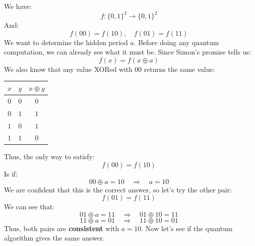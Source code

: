 {}
\noindent
{} We have:
\begin{equation*}
    f: \{0,1\}^2 \to \{0,1\}^2
\end{equation*}
And:
\begin{equation*}
    f(00) = f(10), \quad f(01) = f(11)
\end{equation*}
We want to determine the hidden period $a$. Before doing any quantum computation, we can already see what it must be. Since Simon's promise tells us:
\begin{equation*}
    f(x) = f(x \oplus a)
\end{equation*}
We also know that any value XORed with 00 returns the same value:
\begin{center}
    \begin{tabular}{@{} c c c @{}}
        \toprule
        $x$ & $y$ & $x \oplus y$ \\
        \midrule
        $0$ & $0$ & $0$ \\
        $0$ & $1$ & $1$ \\
        $1$ & $0$ & $1$ \\
        $1$ & $1$ & $0$ \\
        \bottomrule
    \end{tabular}
\end{center}
\noindent
Thus, the only way to satisfy:
\begin{equation*}
    f(00) = f(10)
\end{equation*}
Is if:
\begin{equation*}
    00 \oplus a = 10 \quad \Rightarrow \quad a = 10
\end{equation*}
We are confident that this is the correct answer, so let's try the other pair:
\begin{equation*}
    f(01) = f(11)
\end{equation*}
We can see that:
\begin{equation*}
    01 \oplus a = 11 \quad \Rightarrow \quad 01 \oplus 10 = 11
\end{equation*}
\begin{equation*}
    11 \oplus a = 01 \quad \Rightarrow \quad 11 \oplus 10 = 01
\end{equation*}
Thus, both pairs are \textbf{consistent} with $a = 10$. Now let's see if the quantum algorithm gives the same answer.
